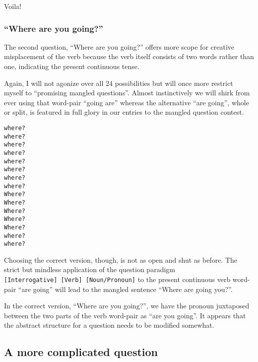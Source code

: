\documentclass[
  11pt,
  british,
  a4paper,
]{article}
\begin{document}
Voila!

\hypertarget{where-are-you-going-1}{%
\subsubsection{``Where are you going?''}\label{where-are-you-going-1}}

The second question, ``Where are you going?'' offers more scope for
creative misplacement of the verb because the verb itself consists of
two words rather than one, indicating the present continuous tense.

Again, I will not agonize over all 24 possibilities but will once more
restrict myself to ``promising mangled questions''. Almost instinctively
we will shirk from ever using that word-pair ``going are'' whereas the
alternative ``are going'', whole or split, is featured in full glory in
our entries to the mangled question contest.

\begin{tcolorbox}
\begin{alltt}
\color{normal}
 where ?
 where ?
  where?
  where ?
  where?
 where?
   where?
 where ?
Where ?
Where ?
Where  ?
Where  ?
Where   ?
 where?
 where ?
\end{alltt}
\end{tcolorbox}

Choosing the correct version, though, is not as open and shut as before.
The strict but mindless application of the question paradigm
\texttt{{[}Interrogative{]}\ {[}Verb{]}\ {[}Noun/Pronoun{]}} to the
present continuous verb word-pair ``are going'' will lead to the mangled
sentence ``Where are going you?''.

In the correct version, ``Where are you going?'', we have the pronoun
juxtaposed between the two parts of the verb word-pair as ``are you
going''. It appears that the abstract structure for a question needs to
be modified somewhat.

\hypertarget{a-more-complicated-question}{%
\subsection{A more complicated
question}\label{a-more-complicated-question}}
\end{document}
